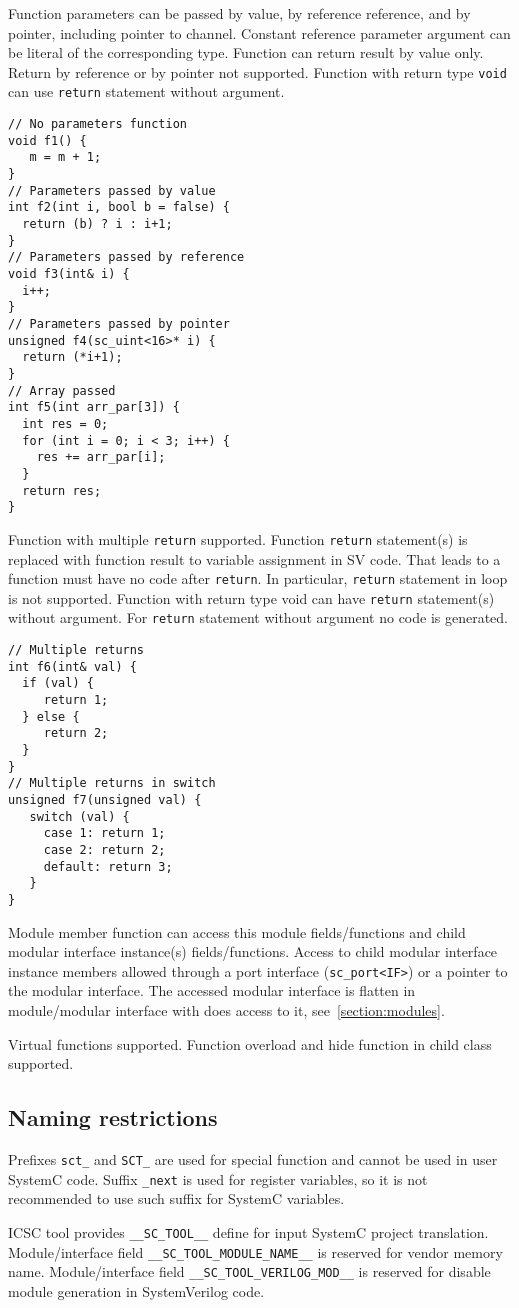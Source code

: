 Function parameters can be passed by value, by reference reference, and by pointer, including pointer to channel. Constant reference parameter argument can be literal of the corresponding type.
Function can return result by value only. Return by reference or by  pointer not supported. Function with return type {\tt void} can use {\tt return} statement without argument. 
%
\begin{lstlisting}[style=mycpp]
// No parameters function
void f1() {
   m = m + 1;
}       
// Parameters passed by value 
int f2(int i, bool b = false) {
  return (b) ? i : i+1;
}    
// Parameters passed by reference 
void f3(int& i) {
  i++;
}
// Parameters passed by pointer
unsigned f4(sc_uint<16>* i) {
  return (*i+1);
}
// Array passed 
int f5(int arr_par[3]) {
  int res = 0;
  for (int i = 0; i < 3; i++) {
    res += arr_par[i];
  }
  return res;
}
\end{lstlisting}

Function with multiple {\tt return} supported. Function {\tt return} statement(s) is replaced with function result to variable assignment in SV code.  That leads to a function must have no code after {\tt return}. In particular, {\tt return} statement in loop is not supported.  Function with return type void can have {\tt return} statement(s) without argument. For {\tt return} statement without argument no code is generated.
%
\begin{lstlisting}[style=mycpp]
// Multiple returns
int f6(int& val) {
  if (val) {
     return 1;
  } else {
     return 2;
  }
}
// Multiple returns in switch
unsigned f7(unsigned val) {
   switch (val) {
     case 1: return 1;
     case 2: return 2;
     default: return 3;
   }
}
\end{lstlisting}

Module member function can access this module fields/functions and child modular interface instance(s) fields/functions. Access to child modular interface instance members allowed through a port interface ({\tt sc\_port<IF>}) or a pointer to the modular interface. The accessed modular interface is flatten in module/modular interface with does access to it, see~\ref{section:modules}.

Virtual functions supported. Function overload and hide function in child class supported.


\subsection{Naming restrictions}

Prefixes {\tt sct\_} and {\tt SCT\_} are used for special function and cannot be used in user SystemC code.
Suffix {\tt \_next} is used for register variables, so it is not recommended to use such suffix for SystemC variables.

ICSC tool provides {\tt \_\_SC\_TOOL\_\_} define for input SystemC project translation. 
Module/interface field {\tt\_\_SC\_TOOL\_MODULE\_NAME\_\_} is reserved for vendor memory name. 
Module/interface field {\tt \_\_SC\_TOOL\_VERILOG\_MOD\_\_} is reserved for disable module generation in SystemVerilog code. 

